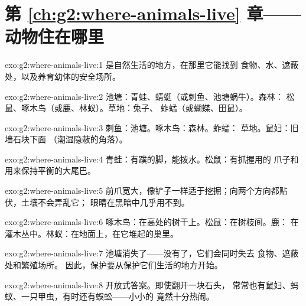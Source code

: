 \section*{第 \ref{ch:g2:where-animals-live} 章——动物住在哪里}

\begin{solution}{exo:g2:where-animals-live:1}
是自然生活的地方，在那里它能找到
食物、水、遮蔽处，以及养育幼体的安全场所。
\end{solution}

\begin{solution}{exo:g2:where-animals-live:2}
池塘：青蛙、蜻蜓（或刺鱼、池塘蜗牛）。森林：
松鼠、啄木鸟（或鹿、林蚁）。草地：兔子、
蚱蜢（或蝴蝶、田鼠）。
\end{solution}

\begin{solution}{exo:g2:where-animals-live:3}
刺鱼：池塘。啄木鸟：森林。蚱蜢：
草地。鼠妇：旧墙石块下面
（潮湿隐蔽的角落）。
\end{solution}

\begin{solution}{exo:g2:where-animals-live:4}
青蛙：有蹼的脚，能拨水。松鼠：有抓握用的
爪子和用来保持平衡的大尾巴。
\end{solution}

\begin{solution}{exo:g2:where-animals-live:5}
前爪宽大，像铲子一样适于挖掘；向两个方向都贴伏，土壤不会弄乱它；
眼睛在黑暗中几乎用不到。
\end{solution}

\begin{solution}{exo:g2:where-animals-live:6}
啄木鸟：在高处的树干上。松鼠：在树枝间。鹿：
在灌木丛中。林蚁：在地面上，在它堆起的巢里。
\end{solution}

\begin{solution}{exo:g2:where-animals-live:7}
池塘消失了——没有了，它们会同时失去
食物、遮蔽处和繁殖场所。
因此，保护要从保护它们生活的地方开始。
\end{solution}

\begin{solution}{exo:g2:where-animals-live:8}
开放式答案。即使翻开一块石头，
常常也有鼠妇、蚂蚁、一只甲虫，有时还有蜈蚣——小小的
竟然十分热闹。
\end{solution}

